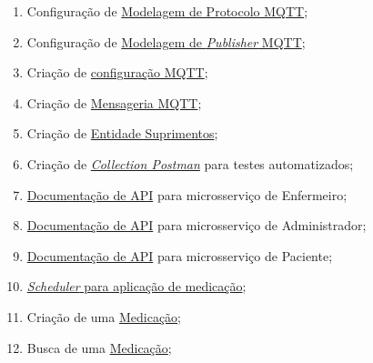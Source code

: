 \begin{apendicesenv}
\begin{enumerate}
    \item Configuração de \href{https://github.com/PillWatcher/pillwatcher-dpb-patient-service/blob/master/src/main/java/br/com/pillwatcher/dpb/config/Mqtt.java#L10}{Modelagem de Protocolo MQTT};
    \item Configuração de \href{https://github.com/PillWatcher/pillwatcher-dpb-patient-service/blob/master/src/main/java/br/com/pillwatcher/dpb/entities/MqttPublish.java#L11}{Modelagem de \textit{Publisher} MQTT};
    \item Criação de \href{https://github.com/PillWatcher/pillwatcher-dpb-patient-service/blob/master/src/main/java/br/com/pillwatcher/dpb/services/impl/MqttServiceImpl.java#L20}{configuração MQTT};
    \item Criação de \href{https://github.com/PillWatcher/pillwatcher-dpb-patient-service/blob/master/src/main/java/br/com/pillwatcher/dpb/services/impl/MqttServiceImpl.java#L34}{Mensageria MQTT};
    \item Criação de \href{https://github.com/PillWatcher/pillwatcher-dpb-patient-service/blob/054b23cdd47e24053d0c910e6ca881ce2af70788/src/main/java/br/com/pillwatcher/dpb/services/impl/SupplyServiceImpl.java#L27}{Entidade Suprimentos};
    \item Criação de \href{https://github.com/PillWatcher/postman-config/blob/master/Pillwatcher - DPB.postman_collection.json}{\textit{Collection Postman}} para testes automatizados;
    \item \href{http://192.99.25.198:8080/swagger-ui.html}{Documentação de API} para microsserviço de Enfermeiro;
    \item \href{http://192.99.25.198:8081/swagger-ui.html}{Documentação de API} para microsserviço de Administrador;
    \item \href{http://192.99.25.198:8082/swagger-ui.html}{Documentação de API} para microsserviço de Paciente;
    \item \href{https://github.com/PillWatcher/pillwatcher-dpb-patient-service/blob/3f23830e41a6db53709f8d627a36c7d189a91595/src/main/java/br/com/pillwatcher/dpb/services/impl/MedicationScheduledServiceImpl.java#L36}{\textit{Scheduler} para aplicação de medicação};
    \item Criação de uma \href{https://github.com/PillWatcher/pillwatcher-dpb-patient-service/blob/master/src/main/java/br/com/pillwatcher/dpb/services/impl/MedicationServiceImpl.java#L44}{Medicação};
    \item Busca de uma \href{https://github.com/PillWatcher/pillwatcher-dpb-patient-service/blob/master/src/main/java/br/com/pillwatcher/dpb/services/impl/MedicationServiceImpl.java#L66}{Medicação};

\end{enumerate}
\end{apendicesenv}
